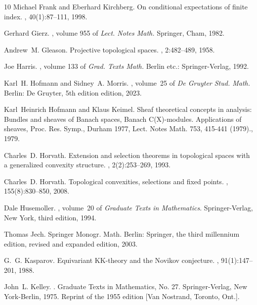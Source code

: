 \documentclass[11pt,leqno]{article}
\theoremstyle{plain}
\theoremstyle{plain}
\theoremstyle{plain}
\numberwithin{equation}{section}
\theoremstyle{nonumberplain}
\newcommand\1{{\bf 1}}
\begin{document}
\begin{thebibliography}{10}
Michael Frank and Eberhard Kirchberg.
\newblock On conditional expectations of finite index.
, 40(1):87--111, 1998.

Gerhard Gierz.
, volume
  955 of {\em Lect. Notes Math.}
\newblock Springer, Cham, 1982.

Andrew~M. Gleason.
\newblock Projective topological spaces.
, 2:482--489, 1958.

Joe Harris.
, volume 133 of {\em Grad.
  Texts Math.}
\newblock Berlin etc.: Springer-Verlag, 1992.

Karl~H. Hofmann and Sidney~A. Morris.
, volume~25 of {\em De Gruyter Stud. Math.}
\newblock Berlin: De Gruyter, 5th edition edition, 2023.

Karl~Heinrich Hofmann and Klaus Keimel.
\newblock Sheaf theoretical concepts in analysis: {Bundles} and sheaves of
  {Banach} spaces, {Banach} {C}({X})-modules.
\newblock Applications of sheaves, {Proc}. {Res}. {Symp}., {Durham} 1977,
  {Lect}. {Notes} {Math}. 753, 415-441 (1979)., 1979.

Charles~D. Horvath.
\newblock Extension and selection theorems in topological spaces with a
  generalized convexity structure.
, 2(2):253--269, 1993.

Charles~D. Horvath.
\newblock Topological convexities, selections and fixed points.
, 155(8):830--850, 2008.

Dale Husemoller.
, volume~20 of {\em Graduate Texts in
  Mathematics}.
\newblock Springer-Verlag, New York, third edition, 1994.

Thomas Jech.
\newblock Springer Monogr. Math. Berlin: Springer, the third millennium
  edition, revised and expanded edition, 2003.

G.~G. Kasparov.
\newblock Equivariant {KK}-theory and the {Novikov} conjecture.
, 91(1):147--201, 1988.

John~L. Kelley.
.
\newblock Graduate Texts in Mathematics, No. 27. Springer-Verlag, New
  York-Berlin, 1975.
\newblock Reprint of the 1955 edition [Van Nostrand, Toronto, Ont.].


\end{thebibliography}
\end{document}
